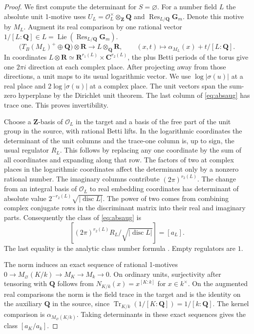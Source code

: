 \documentclass[11pt]{amsart}
\numberwithin{equation}{section}
\theoremstyle{definition}
\theoremstyle{remark}
\newcommand{\Q}{\mathbf Q}
\newcommand{\Z}{\mathbf Z}
\newcommand{\R}{\mathbf R}
\newcommand{\C}{\mathbf C}
\newcommand{\Gm}{\mathbf G_m}
\newcommand{\OO}{\mathcal O}
\newcommand{\Res}{\operatorname{Res}}
\newcommand{\Tr}{\operatorname{Tr}}
\newcommand{\Lie}{\operatorname{Lie}}
\begin{document}
\begin{proof}
We first compute the determinant for $S=\varnothing$.
For a number field $L$ the absolute unit 1-motive uses
$U_L=\OO_L^\times\otimes_\Z\Q$ and $\Res_{L/\Q}\Gm$.
Denote this motive by $M_L$. Augment its real comparison
by one rational vector $1/[L:\Q]\in L=\Lie(\Res_{L/\Q}\Gm)$.
\begin{equation}\label{eq:absaug}
 \bigl(T_B(M_L)^+\oplus\Q\bigr)\otimes\R
 \longrightarrow L\otimes_\Q\R,\qquad
 (x,t)\longmapsto \alpha_{M_L}(x)+t/[L:\Q].
\end{equation}
In coordinates $L\otimes\R\simeq\R^{r_1(L)}\times\C^{r_2(L)}$,
the plus Betti periods of the torus give one $2\pi i$
direction at each complex place. After projecting away
from those directions, a unit maps to its usual logarithmic
vector. We use $\log|\sigma(u)|$ at a real place and
$2\log|\sigma(u)|$ at a complex place. The unit vectors
span the sum-zero hyperplane by the Dirichlet unit theorem.
The last column of \eqref{eq:absaug} has trace one. This
proves invertibility.

Choose a $\Z$-basis of $\OO_L$ in the target and a basis of
the free part of the unit group in the source, with rational
Betti lifts. In the logarithmic coordinates the determinant
of the unit columns and the trace-one column is, up to sign,
the usual regulator $R_L$. This follows by replacing any
one coordinate by the sum of all coordinates and expanding
along that row. The factors of two at complex places in
the logarithmic coordinates affect the determinant only
by a nonzero rational number. The imaginary columns
contribute $(2\pi)^{r_2(L)}$. The change from an integral
basis of $\OO_L$ to real embedding coordinates has determinant
of absolute value $2^{-r_2(L)}\sqrt{|\operatorname{disc}L|}$.
The power of two comes from combining complex conjugate rows
in the discriminant matrix into their real and imaginary parts.
Consequently the
class of \eqref{eq:absaug} is
\[
 \left[(2\pi)^{r_2(L)}R_L/
                      \sqrt{|\operatorname{disc}L|}\right]=[a_L].
\]
The last equality is the analytic class number formula
\cite[Ch.~VII, \S5]{Neukirch}. Empty regulators are $1$.

The norm induces an exact sequence of rational 1-motives
$0\to M_\varnothing(K/k)\to M_K\to M_k\to0$.
On ordinary units, surjectivity after tensoring with
$\Q$ follows from $N_{K/k}(x)=x^{[K:k]}$ for $x\in k^\times$.
On the augmented real comparisons the norm is the field
trace in the target and is the identity on the auxiliary
$\Q$ in the source, since
$\Tr_{K/k}(1/[K:\Q])=1/[k:\Q]$. The kernel comparison is
$\alpha_{M_\varnothing(K/k)}$. Taking determinants in
these exact sequences gives the class $[a_K/a_k]$.


\end{proof}
\end{document}
